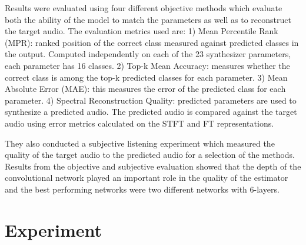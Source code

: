 Results were evaluated using four different objective methods which evaluate both the ability of the model to match the parameters as well as to reconstruct the target audio. The evaluation metrics used are:
1) Mean Percentile Rank (MPR): ranked position of the correct class measured against predicted classes in the output. Computed independently on each of the 23 synthesizer parameters, each parameter has 16 classes.
2) Top-k Mean Accuracy: measures whether the correct class is among the top-k predicted classes for each parameter.
3) Mean Absolute Error (MAE): this measures the error of the predicted class for each parameter.
4) Spectral Reconstruction Quality: predicted parameters are used to synthesize a predicted audio. The predicted audio is compared against the target audio using error metrics calculated on the STFT and FT representations.

They also conducted a subjective listening experiment which measured the quality of the target audio to the predicted audio for a selection of the methods. Results from the objective and subjective evaluation showed that the depth of the convolutional network played an important role in the quality of the estimator and the best performing networks were two different networks with 6-layers.

\section{Experiment}
